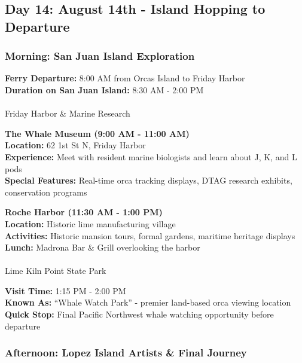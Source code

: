 \documentclass[
  11pt,
  letterpaper,
  DIV=10,
  numbers=noendperiod]{scrartcl}
\makeatletter
\let\oldparagraph\paragraph
\renewcommand{\paragraph}{
    \@ifstar
      \xxxParagraphStar
      \xxxParagraphNoStar
  }
\newcommand{\xxxParagraphStar}[1]{\oldparagraph*{#1}\mbox{}}
\newcommand{\xxxParagraphNoStar}[1]{\oldparagraph{#1}\mbox{}}
\makeatother
\begin{document}
\subsection{Day 14: August 14th - Island Hopping to
Departure}\label{day-14-august-14th---island-hopping-to-departure}

\subsubsection{Morning: San Juan Island
Exploration}\label{morning-san-juan-island-exploration}

\textbf{Ferry Departure:} 8:00 AM from Orcas Island to Friday Harbor\\
\textbf{Duration on San Juan Island:} 8:30 AM - 2:00 PM

\paragraph{Friday Harbor \& Marine
Research}\label{friday-harbor-marine-research}

\textbf{The Whale Museum (9:00 AM - 11:00 AM)}\\
\textbf{Location:} 62 1st St N, Friday Harbor\\
\textbf{Experience:} Meet with resident marine biologists and learn
about J, K, and L pods\\
\textbf{Special Features:} Real-time orca tracking displays, DTAG
research exhibits, conservation programs

\textbf{Roche Harbor (11:30 AM - 1:00 PM)}\\
\textbf{Location:} Historic lime manufacturing village\\
\textbf{Activities:} Historic mansion tours, formal gardens, maritime
heritage displays\\
\textbf{Lunch:} Madrona Bar \& Grill overlooking the harbor

\paragraph{Lime Kiln Point State Park}\label{lime-kiln-point-state-park}

\textbf{Visit Time:} 1:15 PM - 2:00 PM\\
\textbf{Known As:} ``Whale Watch Park'' - premier land-based orca
viewing location\\
\textbf{Quick Stop:} Final Pacific Northwest whale watching opportunity
before departure

\subsubsection{Afternoon: Lopez Island Artists \& Final
Journey}\label{afternoon-lopez-island-artists-final-journey}
\end{document}
